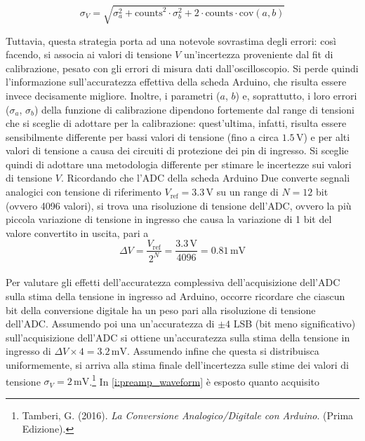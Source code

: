 \documentclass[a4paper,11pt]{article} %
\begin{document}
\begin{equation}
	\sigma_{V} = \sqrt{\sigma_a^2 + \text{counts}^2 \cdot \sigma_b^2 + 2 \cdot \text{counts} \cdot \text{cov}(a,b)}
\end{equation}

Tuttavia, questa strategia porta ad una notevole sovrastima degli errori: così facendo, si associa ai valori di tensione
$V$ un'incertezza proveniente dal fit di calibrazione, pesato con gli errori di misura dati dall'oscilloscopio. Si perde
quindi l'informazione sull'accuratezza effettiva della scheda Arduino, che risulta essere invece decisamente migliore.
Inoltre, i parametri ($a$, $b$) e, soprattutto, i loro errori ($\sigma_a$, $\sigma_b$) della funzione di calibrazione
dipendono fortemente dal range di tensioni che si sceglie di adottare per la calibrazione: quest'ultima, infatti,
risulta essere sensibilmente differente per bassi valori di tensione (fino a circa $1.5\,\si{\volt}$) e per alti valori
di tensione a causa dei circuiti di protezione dei pin di ingresso. Si sceglie quindi di adottare una metodologia
differente per stimare le incertezze sui valori di tensione $V$. Ricordando che l'ADC della scheda Arduino Due converte
segnali analogici con tensione di riferimento $V_{\text{ref}}=3.3\,\si{\volt}$ su un range di $N = 12$ bit (ovvero 4096
valori), si trova una risoluzione di tensione dell’ADC, ovvero la più piccola variazione di tensione in ingresso che
causa la variazione di 1 bit del valore convertito in uscita, pari a 
\begin{equation}
	\Delta V = \frac{V_{\text{ref}}}{2^N} = \frac{3.3\,\si{\volt}}{4096} = 0.81 \,\si{\milli\volt}
\end{equation}\\
Per valutare gli effetti dell'accuratezza complessiva dell’acquisizione dell’ADC sulla stima della tensione in ingresso
ad Arduino, occorre ricordare che ciascun bit della conversione digitale ha un peso pari alla risoluzione di tensione
dell’ADC. Assumendo poi una un'accuratezza di $\pm 4$ LSB (bit meno significativo) sull’acquisizione dell’ADC si ottiene
un'accuratezza sulla stima della tensione in ingresso di $\Delta V \times 4 = 3.2 \,\si{\milli\volt}$. Assumendo infine
che questa si distribuisca uniformemente, si arriva alla stima finale dell'incertezza sulle stime dei valori di tensione
$\sigma_{V} = 2 \,\si{\milli\volt}$.\footnote{Tamberi, G. (2016). \textit{La Conversione Analogico/Digitale con
Arduino}. (Prima Edizione).} In \autoref{i:preamp_waveform} è esposto quanto acquisito 
\end{document}
